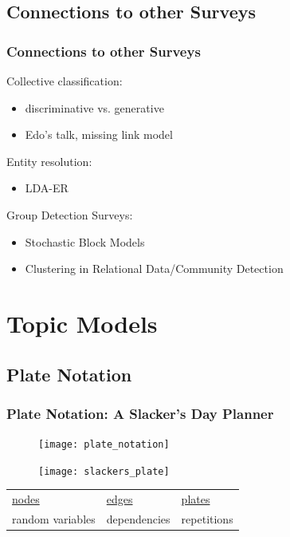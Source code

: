 \documentclass[10pt, svgnames]{beamer}
\begin{document}
\subsection{Connections to other Surveys}

\begin{frame}
\frametitle{Connections to other Surveys}

Collective classification:
\begin{itemize}
\item \footnotesize{discriminative vs. generative}
\item \footnotesize{Edo's talk, missing link model \cite{cohn:nips01}}
\end{itemize}

\vspace{10pt}

Entity resolution:
\begin{itemize}
\item \footnotesize{LDA-ER}
\end{itemize}

\vspace{10pt}

Group Detection Surveys:
\begin{itemize}
\item Stochastic Block Models
\item Clustering in Relational Data/Community Detection
\end{itemize}

\end{frame}

\section{Topic Models}

\subsection{Plate Notation}

\begin{frame}
\frametitle{Plate Notation: A Slacker's Day Planner}

\begin{figure}
\begin{minipage}{0.7\linewidth}
\texttt{[image: plate\_notation]}
\end{minipage}
\hfill
\begin{minipage}{0.25\linewidth}
\texttt{[image: slackers\_plate]}
\end{minipage}
\end{figure}

\begin{center}
\begin{tabular}{p{4cm} p{4cm} p{4cm}}
\underline{nodes} & \underline{edges} & \underline{plates}\\
random variables & dependencies & repetitions\\
\end{tabular}
\end{center}

\end{frame}
\end{document}
